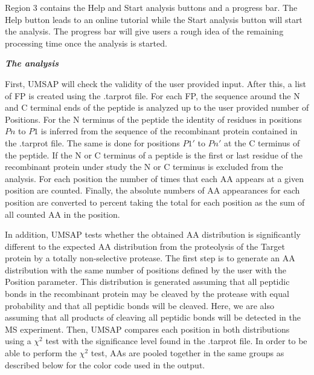 Region \num{3} contains the Help and Start analysis buttons and a progress bar. The Help button leads to an online tutorial while the Start analysis button will start the analysis. The progress bar will give users a rough idea of the remaining processing time once the analysis is started.

\textit{\textbf{The analysis}}

First, UMSAP will check the validity of the user provided input. After this, a list of FP is created using the .tarprot file. For each FP, the sequence around the N and C terminal ends of the peptide is analyzed up to the user provided number of Positions. For the N terminus of the peptide the identity of residues in positions \(Pn\) to \(P1\) is inferred from the sequence of the recombinant protein contained in the .tarprot file. The same is done for positions \(P1'\) to \(Pn'\) at the C terminus of the peptide. If the N or C terminus of a peptide is the first or last residue of the recombinant protein under study the N or C terminus is excluded from the analysis. For each position the number of times that each AA appears at a given position are counted. Finally, the absolute numbers of AA appearances for each position are converted to percent taking the total for each position as the sum of all counted AA in the position.

In addition, UMSAP tests whether the obtained AA distribution is significantly different to the expected AA distribution from the proteolysis of the Target protein by a totally non-selective protease. The first step is to generate an AA distribution with the same number of positions defined by the user with the Position parameter. This distribution is generated assuming that all peptidic bonds in the recombinant protein may be cleaved by the protease with equal probability and that all peptidic bonds will be cleaved. Here, we are also assuming that all products of cleaving all peptidic bonds will be detected in the MS experiment. Then, UMSAP compares each position in both distributions using a $\chi^2$ test with the significance level found in the .tarprot file. In order to be able to perform the $\chi^2$ test, AAs are pooled together in the same groups as described below for the color code used in the output.    

